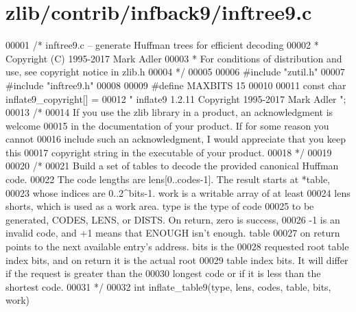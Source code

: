 \hypertarget{zlib_2contrib_2infback9_2inftree9_8c_source}{}\section{zlib/contrib/infback9/inftree9.c}
\label{zlib_2contrib_2infback9_2inftree9_8c_source}

\begin{DoxyCode}
00001 \textcolor{comment}{/* inftree9.c -- generate Huffman trees for efficient decoding}
00002 \textcolor{comment}{ * Copyright (C) 1995-2017 Mark Adler}
00003 \textcolor{comment}{ * For conditions of distribution and use, see copyright notice in zlib.h}
00004 \textcolor{comment}{ */}
00005 
00006 \textcolor{preprocessor}{#include "zutil.h"}
00007 \textcolor{preprocessor}{#include "inftree9.h"}
00008 
00009 \textcolor{preprocessor}{#define MAXBITS 15}
00010 
00011 \textcolor{keyword}{const} \textcolor{keywordtype}{char} inflate9\_copyright[] =
00012    \textcolor{stringliteral}{" inflate9 1.2.11 Copyright 1995-2017 Mark Adler "};
00013 \textcolor{comment}{/*}
00014 \textcolor{comment}{  If you use the zlib library in a product, an acknowledgment is welcome}
00015 \textcolor{comment}{  in the documentation of your product. If for some reason you cannot}
00016 \textcolor{comment}{  include such an acknowledgment, I would appreciate that you keep this}
00017 \textcolor{comment}{  copyright string in the executable of your product.}
00018 \textcolor{comment}{ */}
00019 
00020 \textcolor{comment}{/*}
00021 \textcolor{comment}{   Build a set of tables to decode the provided canonical Huffman code.}
00022 \textcolor{comment}{   The code lengths are lens[0..codes-1].  The result starts at *table,}
00023 \textcolor{comment}{   whose indices are 0..2^bits-1.  work is a writable array of at least}
00024 \textcolor{comment}{   lens shorts, which is used as a work area.  type is the type of code}
00025 \textcolor{comment}{   to be generated, CODES, LENS, or DISTS.  On return, zero is success,}
00026 \textcolor{comment}{   -1 is an invalid code, and +1 means that ENOUGH isn't enough.  table}
00027 \textcolor{comment}{   on return points to the next available entry's address.  bits is the}
00028 \textcolor{comment}{   requested root table index bits, and on return it is the actual root}
00029 \textcolor{comment}{   table index bits.  It will differ if the request is greater than the}
00030 \textcolor{comment}{   longest code or if it is less than the shortest code.}
00031 \textcolor{comment}{ */}
00032 \textcolor{keywordtype}{int} inflate\_table9(type, lens, codes, table, bits, work)

\end{DoxyCode}

